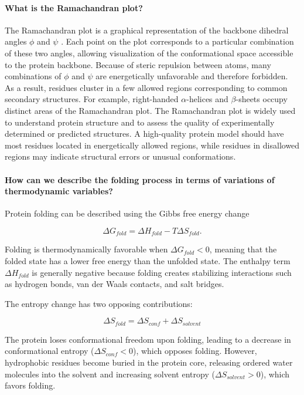 \paragraph{What is the Ramachandran plot?}
The Ramachandran plot is a graphical representation of the backbone dihedral angles $\phi$ and $\psi$ . Each point on the plot corresponds to a particular combination of these two angles, allowing visualization of the conformational space accessible to the protein backbone.
Because of steric repulsion between atoms, many combinations of $\phi$ and $\psi$ are energetically unfavorable and therefore forbidden. As a result, residues cluster in a few allowed regions corresponding to common secondary structures. For example, right-handed $\alpha$-helices and $\beta$-sheets occupy distinct areas of the Ramachandran plot.
The Ramachandran plot is widely used to understand protein structure and to assess the quality of experimentally determined or predicted structures. A high-quality protein model should have most residues located in energetically allowed regions, while residues in disallowed regions may indicate structural errors or unusual conformations.


\paragraph{How can we describe the folding process in terms of variations of thermodynamic variables?}

Protein folding can be described using the Gibbs free energy change

\[
\Delta G_{fold} = \Delta H_{fold} - T\Delta S_{fold}.
\]

Folding is thermodynamically favorable when $\Delta G_{fold}<0$, meaning that the folded state has a lower free energy than the unfolded state. The enthalpy term $\Delta H_{fold}$ is generally negative because folding creates stabilizing interactions such as hydrogen bonds, van der Waals contacts, and salt bridges.

The entropy change has two opposing contributions:

\[
\Delta S_{fold} = \Delta S_{conf} + \Delta S_{solvent}
\]

The protein loses conformational freedom upon folding, leading to a decrease in conformational entropy ($\Delta S_{conf}<0$), which opposes folding. However, hydrophobic residues become buried in the protein core, releasing ordered water molecules into the solvent and increasing solvent entropy ($\Delta S_{solvent}>0$), which favors folding.


